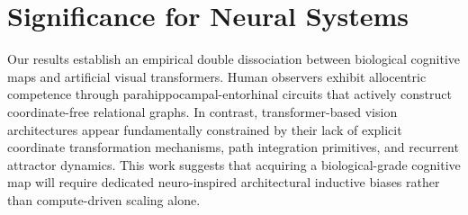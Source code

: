 \documentclass[12pt,letterpaper]{article}
\begin{document}
\section{Significance for Neural Systems}
Our results establish an empirical double dissociation between biological cognitive maps and artificial visual transformers.
Human observers exhibit allocentric competence through parahippocampal-entorhinal circuits that actively construct coordinate-free relational graphs.
In contrast, transformer-based vision architectures appear fundamentally constrained by their lack of explicit coordinate transformation mechanisms, path integration primitives, and recurrent attractor dynamics.
This work suggests that acquiring a biological-grade cognitive map will require dedicated neuro-inspired architectural inductive biases rather than compute-driven scaling alone.

\small


\end{document}
